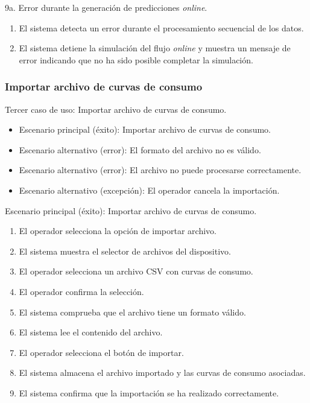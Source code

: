 \documentclass[12pt,a4paper]{report}
\begin{document}
\medskip

9a. Error durante la generación de predicciones \emph{online}.
\begin{enumerate}[leftmargin=1.5cm]
    \item El sistema detecta un error durante el procesamiento secuencial de los datos.
    \item El sistema detiene la simulación del flujo \emph{online} y muestra un mensaje de error indicando que no ha sido posible completar la simulación.
\end{enumerate}

\medskip

\subsubsection{Importar archivo de curvas de consumo}

\noindent Tercer caso de uso: Importar archivo de curvas de consumo.

\begin{itemize}[leftmargin=1.5cm]
    \item Escenario principal (éxito): Importar archivo de curvas de consumo.
    \item Escenario alternativo (error): El formato del archivo no es válido.
    \item Escenario alternativo (error): El archivo no puede procesarse correctamente.
    \item Escenario alternativo (excepción): El operador cancela la importación.
\end{itemize}

\medskip

\noindent Escenario principal (éxito): Importar archivo de curvas de consumo.

\begin{enumerate}[leftmargin=1.5cm]
    \item El operador selecciona la opción de importar archivo.
    \item El sistema muestra el selector de archivos del dispositivo.
    \item El operador selecciona un archivo CSV con curvas de consumo.
    \item El operador confirma la selección.
    \item El sistema comprueba que el archivo tiene un formato válido.
    \item El sistema lee el contenido del archivo.
    \item El operador selecciona el botón de importar.
    \item El sistema almacena el archivo importado y las curvas de consumo asociadas.
    \item El sistema confirma que la importación se ha realizado correctamente.
\end{enumerate}
\end{document}
